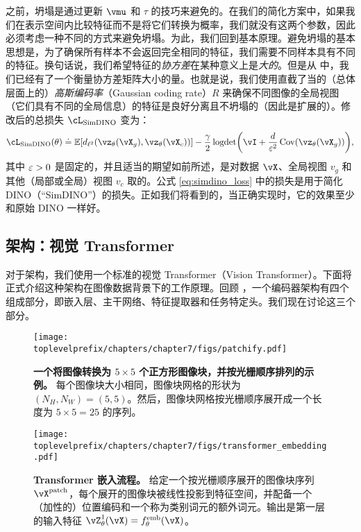 \documentclass[../../book-main.tex]{subfiles}
\begin{document}
之前，坍塌是通过更新 \(\vmu\) 和 \(\tau\) 的技巧来避免的。在我们的简化方案中，如果我们在表示空间内比较特征而不是将它们转换为概率，我们就没有这两个参数，因此必须考虑一种不同的方式来避免坍塌。为此，我们回到基本原理。避免坍塌的基本思想是，为了确保所有样本不会返回完全相同的特征，我们需要不同样本具有不同的特征。换句话说，我们希望特征的\textit{协方差}在某种意义上是\textit{大的}。但是从  中，我们已经有了一个衡量协方差矩阵大小的量。也就是说，我们使用直截了当的（总体层面上的）\textit{高斯编码率}（Gaussian coding rate）\(R\) 来确保不同图像的全局视图（它们具有不同的全局信息）的特征是良好分离且不坍塌的（因此是扩展的）。修改后的总损失 \(\cL_{\simdino}\) 变为：
\begin{equation}\label{eq:simdino_loss}
    \cL_{\simdino}(\theta) \doteq \Ex[d_{\ell^{2}}(\vz_{\theta}(\vX_{g}), \vz_{\theta}(\vX_{c}))] - \frac{\gamma}{2}\logdet\rp{\vI + \frac{d}{\eps^{2}}\Cov(\vz_{\theta}(\vX_{g}))},
\end{equation}
其中 \(\varepsilon > 0\) 是固定的，并且适当的期望如前所述，是对数据 \(\vX\)、全局视图 \(v_{g}\) 和其他（局部或全局）视图 \(v_{c}\) 取的。公式 \eqref{eq:simdino_loss} 中的损失是用于简化 DINO（“SimDINO”）的损失。正如我们将看到的，当正确实现时，它的效果至少和原始 DINO 一样好。

\subsection{架构：视觉 Transformer}\label{sub:contrastive_learning_architecture}

对于架构，我们使用一个标准的视觉 Transformer（Vision Transformer）。下面将正式介绍这种架构在图像数据背景下的工作原理。回顾 ，一个编码器架构有四个组成部分，即嵌入层、主干网络、特征提取器和任务特定头。我们现在讨论这三个部分。

\begin{figure}
    \centering 
    \texttt{[image: \\toplevelprefix/chapters/chapter7/figs/patchify.pdf]}
    \caption{\small\textbf{一个将图像转换为 \(5 \times 5\) 个正方形图像块，并按光栅顺序排列的示例。} 每个图像块大小相同，图像块网格的形状为 \((N_{H}, N_{W}) = (5, 5)\)。然后，图像块网格按光栅顺序展开成一个长度为 \(5 \times 5 = 25\) 的序列。}
    \label{fig:patchify_rasterize}
\end{figure}

\begin{figure}
    \centering 
    \texttt{[image: \\toplevelprefix/chapters/chapter7/figs/transformer\_embedding.pdf]}
    \caption{\small\textbf{Transformer 嵌入流程。} 给定一个按光栅顺序展开的图像块序列 \(\vX^{\patch}\)，每个展开的图像块被线性投影到特征空间，并配备一个（加性的）位置编码和一个称为类别词元的额外词元。输出是第一层的输入特征 \(\vZ_{\theta}^{1}(\vX) = f_{\theta}^{\emb}(\vX)\)。}
    \label{fig:transformer_embedding}
\end{figure}
\end{document}

